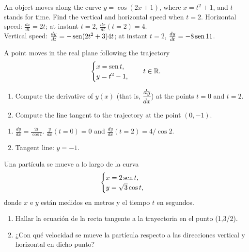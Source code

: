 
{An object moves along the curve $y=\cos(2x+1)$, where $x=t^2+1$, and $t$ stands for time. Find the vertical and horizontal speed when
$t=2$.
}
{Horizontal speed: $\frac{dx}{dt} = 2t$; at instant $t=2$, $\frac{dx}{dt}(t=2)=4$.\\
Vertical speed: $\frac{dy}{dt}=-\operatorname{sen}(2t^2+3)4t$; at instant $t=2$, $\frac{dy}{dt}=-8\operatorname{sen} 11$.
}
{
}


{A point moves in the real plane following the trajectory
\[
\begin{cases}
x= \operatorname{sen} t,\\
y = t^2-1,
\end{cases}
\quad t\in \mathbb{R}.
\]
\begin{enumerate}
\item Compute the derivative of $y(x)$ (that is, $\dfrac{dy}{dx}$) at the points $t=0$ and $t=2$.
\item Compute the line tangent to the trajectory at the point $(0,-1)$.
\end{enumerate}
}
{\begin{enumerate}
\item $\frac{dy}{dx} = \frac{2t}{\cos t}$. $\frac{y}{dx}(t=0) = 0$ and $\frac{dy}{dx}(t=2) = 4/\cos 2$.
\item Tangent line: $y=-1$.
\end{enumerate}
}
{
}


{Una partícula se mueve a lo largo de la curva
\[
\begin{cases}
x=2\operatorname{sen} t, \\
y=\sqrt{3}\cos t,
\end{cases}
\]
donde $x$ e $y$ están medidos en metros y el tiempo $t$ en
segundos.
\begin{enumerate}
\item  Hallar la ecuación de la recta tangente a la trayectoria en el punto (1,3/2).
\item  ¿Con qué velocidad se mueve la partícula respecto a las direcciones vertical y horizontal en dicho punto?
\end{enumerate}
}


